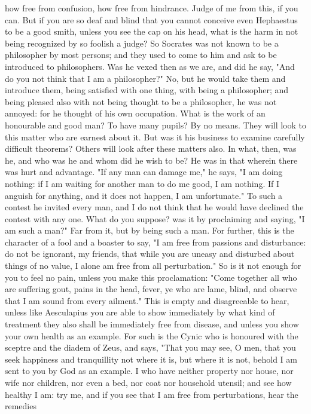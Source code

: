 \documentclass[a4paper]{article}
\begin{document}
how free from confusion, how free from hindrance. Judge of me from this, if you
can. But if you are so deaf and blind that you cannot conceive even Hephaestus
to be a good smith, unless you see the cap on his head, what is the harm in not
being recognized by so foolish a judge?
    So Socrates was not known to be a philosopher by most persons; and they
used to come to him and ask to be introduced to philosophers. Was he vexed then
as we are, and did he say, "And do you not think that I am a philosopher?" No,
but he would take them and introduce them, being satisfied with one thing, with
being a philosopher; and being pleased also with not being thought to be a
philosopher, he was not annoyed: for he thought of his own occupation. What is
the work of an honourable and good man? To have many pupils? By no means. They
will look to this matter who are earnest about it. But was it his business to
examine carefully difficult theorems? Others will look after these matters
also. In what, then, was he, and who was he and whom did he wish to be? He was
in that wherein there was hurt and advantage. "If any man can damage me," he
says, "I am doing nothing: if I am waiting for another man to do me good, I am
nothing. If I anguish for anything, and it does not happen, I am unfortunate."
To such a contest he invited every man, and I do not think that he would have
declined the contest with any one. What do you suppose? was it by proclaiming
and saying, "I am such a man?" Far from it, but by being such a man. For
further, this is the character of a fool and a boaster to say, "I am free from
passions and disturbance: do not be ignorant, my friends, that while you are
uneasy and disturbed about things of no value, I alone am free from all
perturbation." So is it not enough for you to feel no pain, unless you make
this proclamation: "Come together all who are suffering gout, pains in the
head, fever, ye who are lame, blind, and observe that I am sound from every
ailment." This is empty and disagreeable to hear, unless like Aesculapius you
are able to show immediately by what kind of treatment they also shall be
immediately free from disease, and unless you show your own health as an
example.
    For such is the Cynic who is honoured with the sceptre and the diadem of
Zeus, and says, "That you may see, O men, that you seek happiness and
tranquillity not where it is, but where it is not, behold I am sent to you by
God as an example. I who have neither property nor house, nor wife nor
children, nor even a bed, nor coat nor household utensil; and see how healthy I
am: try me, and if you see that I am free from perturbations, hear the remedies
\end{document}
